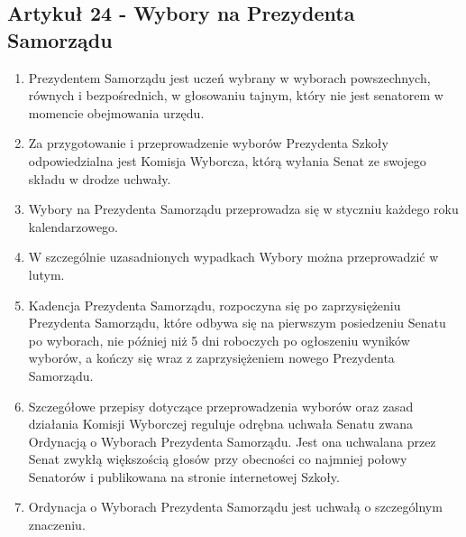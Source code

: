 \documentclass[14pt]{article}
\newenvironment{ustepy}{%
	\begin{enumerate}[leftmargin=1.5em, itemindent=1pt, labelwidth=1em, itemsep=5pt]
	}{%
	\end{enumerate}
}
\begin{document}
\subsection*{Artykuł 24 - Wybory na Prezydenta Samorządu}
\begin{ustepy}
	\item Prezydentem Samorządu jest uczeń wybrany w wyborach powszechnych, równych i bezpośrednich, w głosowaniu tajnym, który nie jest senatorem w momencie obejmowania urzędu.
	\item Za przygotowanie i przeprowadzenie wyborów Prezydenta Szkoły odpowiedzialna jest Komisja Wyborcza, którą wyłania Senat ze swojego składu w drodze uchwały.
	\item Wybory na Prezydenta Samorządu przeprowadza się w styczniu każdego roku kalendarzowego.
	\item W szczególnie uzasadnionych wypadkach Wybory można przeprowadzić w lutym.
	\item Kadencja Prezydenta Samorządu, rozpoczyna się po zaprzysiężeniu Prezydenta Samorządu, które odbywa się na pierwszym posiedzeniu Senatu po wyborach, nie później niż 5 dni roboczych po ogłoszeniu wyników wyborów, a kończy się wraz z zaprzysiężeniem nowego Prezydenta Samorządu.
	\item Szczegółowe przepisy dotyczące przeprowadzenia wyborów oraz zasad działania Komisji Wyborczej reguluje odrębna uchwała Senatu zwana Ordynacją o Wyborach Prezydenta Samorządu. Jest ona uchwalana przez Senat zwykłą większością głosów przy obecności co najmniej połowy Senatorów i publikowana na stronie internetowej Szkoły.
	\item Ordynacja o Wyborach Prezydenta Samorządu jest uchwałą o szczególnym znaczeniu.
\end{ustepy}
\newpage
\end{document}
